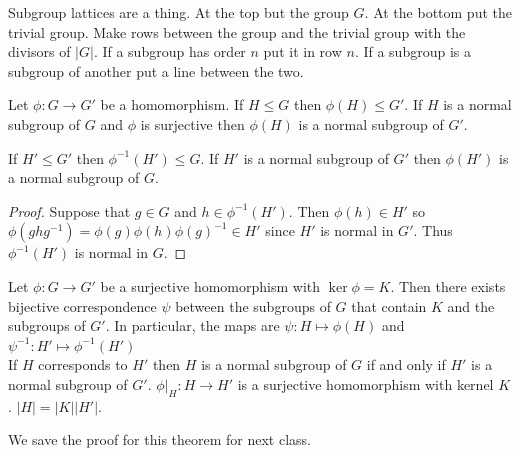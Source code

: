 \documentclass{article}
\newcommand{\ra}[1][]{\xrightarrow{#1}}
\begin{document}
Subgroup lattices are a thing. At the top but the group $G$. At the bottom put the trivial group. Make rows between the group and the trivial group with the divisors of $|G|$. If a subgroup has order $n$ put it in row $n$. If a subgroup is a subgroup of another put a line between the two.
\begin{proposition}
Let $\phi:G\ra{}G'$ be a homomorphism. If $H\leq G$ then $\phi(H)\leq G'$. If $H$ is a normal subgroup of $G$ and $\phi$ is surjective then $\phi(H)$ is a normal subgroup of $G'$.
\end{proposition}
\begin{proposition}
If $H'\leq G'$ then $\phi^{-1}(H')\leq G$. If $H'$ is a normal subgroup of $G'$ then $\phi(H')$ is a normal subgroup of $G$.
\end{proposition}
\begin{proof}
Suppose that $g\in G$ and $h\in \phi^{-1}(H')$. Then $\phi(h)\in H'$ so $\phi(ghg^{-1})=\phi(g)\phi(h)\phi(g)^{-1}\in H'$ since $H'$ is normal in $G'$. Thus $\phi^{-1}(H')$ is normal in $G$.
\end{proof}
\begin{theorem}
Let $\phi:G\ra G'$ be a surjective homomorphism with $\ker\phi=K$. Then there exists bijective correspondence $\psi$ between the subgroups of $G$ that contain $K$ and the subgroups of $G'$. In particular, the maps are $\psi:H\mapsto \phi(H)$ and $\psi^{-1}:H'\mapsto\phi^{-1}(H')$
\\
If $H$ corresponds to $H'$ then $H$ is a normal subgroup of $G$ if and only if $H'$ is a normal subgroup of $G'$. $\phi|_H:H\ra H'$ is a surjective homomorphism with kernel $K$. $|H|=|K||H'|$.
\end{theorem}
We save the proof for this theorem for next class.
\end{document}
